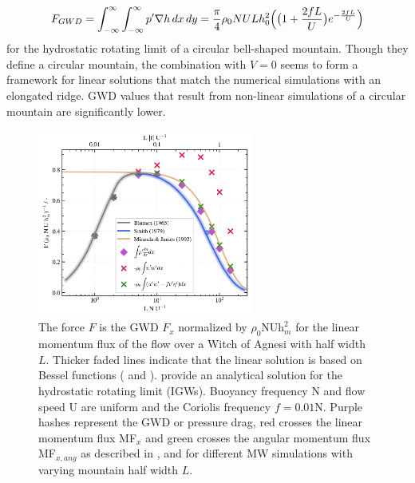 \begin{equation}
    F_{GWD} = \int_{-\infty}^{\infty} \int_{-\infty}^{\infty} p' \nabla h \, dx \, dy = \frac{\pi}{4} \rho_0 N U L h_0^2 \Bigl( \bigl(1 + \frac{2fL}{U}\bigr) e^{-\frac{2fL}{U}} \Bigr)
    \label{equ:gwd-miranda}
\end{equation}
for the hydrostatic rotating limit of a circular bell-shaped mountain. Though they define a circular mountain, the combination with $V=0$ seems to form a framework for linear solutions that match the numerical simulations with an elongated ridge. GWD values that result from non-linear simulations of a circular mountain are significantly lower.
 \begin{figure}[t]
    \centering
    \includegraphics[width=0.63\textwidth]{figures_model/GWD-linearTheory-Q3D.png}
    \caption{The force $F$ is the GWD $F_x$ normalized by $\rho_0 \textrm{N} \textrm{U} \textrm{h}_m^2$ for the linear momentum flux of the flow over a Witch of Agnesi with half width $L$. Thicker faded lines indicate that the linear solution is based on Bessel functions (\cite[]{blumen_momentum_1965} and \cite[]{smith_influence_1979}). \textcite[]{miranda_non-linear_1992} provide an analytical solution for the hydrostatic rotating limit (IGWs). Buoyancy frequency N and flow speed U are uniform and the Coriolis frequency $f=0.01$N. Purple hashes represent the GWD or pressure drag, red crosses the linear momentum flux MF$_x$ and green crosses the angular momentum flux MF$_{x,ang}$ as described in \textcite[]{bretherton_momentum_1969}, \textcite[]{smith_influence_1979} and \textcite[]{broad_linear_1995} for different MW simulations with varying mountain half width $L$.}
    \label{fig:GWD-MWs}
\end{figure}

